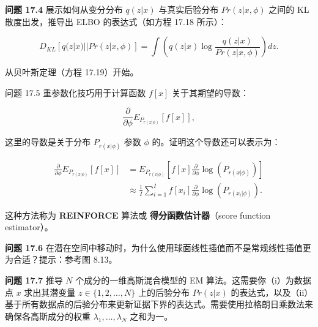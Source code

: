 \textbf{问题 17.4} 展示如何从变分分布 \(q(z|x)\) 与真实后验分布 \(Pr(z|x, \phi)\) 之间的 KL 散度出发，推导出 ELBO 的表达式（如方程 17.18 所示）：

\begin{equation}
D_{KL} [q(z|x) || Pr(z|x, \phi)] = \int (q(z|x) \log \frac{q(z|x)}{Pr(z|x, \phi)}) dz. 
\end{equation}

从贝叶斯定理（方程 17.19）开始。

问题 17.5 重参数化技巧用于计算函数 \(f[x]\) 关于其期望的导数：

\begin{equation}
\frac{\partial}{\partial\phi} E_{P_{r(x|\phi)}} [f[x]], 
\end{equation}

这里的导数是关于分布 \(P_{r(x|\phi)}\) 参数 \(\phi\) 的。证明这个导数还可以表示为：


\begin{align}
\frac{\partial}{\partial\phi} E_{P_{r(x|\phi)}} [f[x]] &= E_{P_{r(x|\phi)}} \left[ f[x] \frac{\partial}{\partial\phi} \log(P_{r(x|\phi)}) \right] \\
&\approx \frac{1}{I} \sum_{i=1}^{I} f[x_i] \frac{\partial}{\partial\phi} \log(P_{r(x_i|\phi)}). 
\end{align} 


这种方法称为 \textbf{REINFORCE} 算法或 \textbf{得分函数估计器}（score function estimator）。

\textbf{问题 17.6} 在潜在空间中移动时，为什么使用球面线性插值而不是常规线性插值更为合适？提示：参考图 8.13。

\textbf{问题 17.7} 推导 \(N\) 个成分的一维高斯混合模型的 EM 算法。这需要你（i）为数据点 \(x\) 求出其潜变量 \(z \in \{1, 2, \ldots, N\}\) 上的后验分布 \(Pr(z|x)\) 的表达式，以及（ii）基于所有数据点的后验分布来更新证据下界的表达式。需要使用拉格朗日乘数法来确保各高斯成分的权重 \(\lambda_1, \ldots, \lambda_N\) 之和为一。
